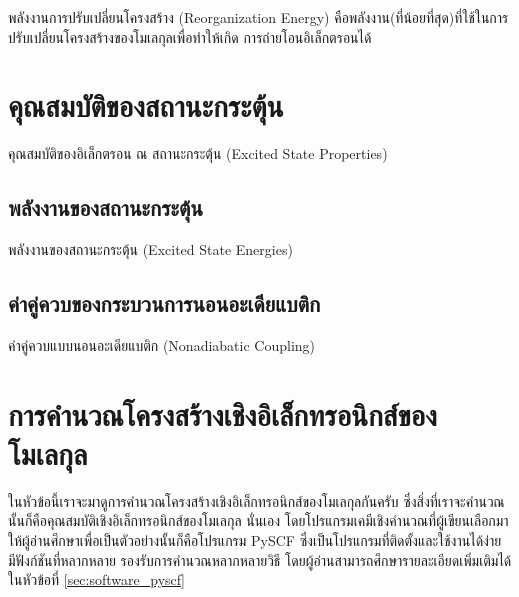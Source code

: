 พลังงานการปรับเปลี่ยนโครงสร้าง (Reorganization Energy) คือพลังงาน(ที่น้อยที่สุด)ที่ใช้ในการปรับเปลี่ยนโครงสร้างของโมเลกุลเพื่อทำให้เกิด%
การถ่ายโอนอิเล็กตรอนได้

\section{คุณสมบัติของสถานะกระตุ้น}
\label{sec:ex_prop}

คุณสมบัติของอิเล็กตรอน ณ สถานะกระตุ้น (Excited State Properties)

\subsection{พลังงานของสถานะกระตุ้น}
\label{ssec:ex_ener}

พลังงานของสถานะกระตุ้น (Excited State Energies)

\subsection{ค่าคู่ควบของกระบวนการนอนอะเดียแบติก}
\label{ssec:nonadia_ener}

ค่าคู่ควบแบบนอนอะเดียแบติก (Nonadiabatic Coupling)

\section{การคำนวณโครงสร้างเชิงอิเล็กทรอนิกส์ของโมเลกุล}
\label{sec:comp_elec_strct}

ในหัวข้อนี้เราจะมาดูการคำนวณโครงสร้างเชิงอิเล็กทรอนิกส์ของโมเลกุลกันครับ ซึ่งสิ่งที่เราจะคำนวณนั้นก็คือคุณสมบัติเชิงอิเล็กทรอนิกส์ของโมเลกุล%
นั่นเอง โดยโปรแกรมเคมีเชิงคำนวณที่ผู้เขียนเลือกมาให้ผู้อ่านศึกษาเพื่อเป็นตัวอย่างนั้นก็คือโปรแกรม PySCF ซึ่งเป็นโปรแกรมที่ติดตั้งและใช้งานได้ง่าย 
มีฟังก์ชันที่หลากหลาย รองรับการคำนวณหลากหลายวิธี โดยผู้อ่านสามารถศึกษารายละเอียดเพิ่มเติมได้ในหัวข้อที่ \ref{sec:software_pyscf}

